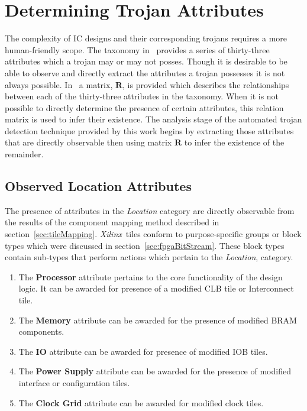 \documentclass[conference]{IEEEtran}
\newcommand{\Xilinx}{\textit{\gls{Xilinx}}~}
\begin{document}
\section{Determining Trojan Attributes} \label{sec:trojanAttributes}
The complexity of \acrlong{IC} designs and their corresponding trojans requires a more human-friendly scope.
The taxonomy in~\cite{samerAttribute} provides a series of thirty-three attributes which a trojan may or may not posses.
Though it is desirable to be able to observe and directly extract the attributes a trojan possesses it is not always possible. 
In~\cite{samerAttribute} a matrix, $\mathbf{R}$, is provided which describes the relationships between each of the thirty-three attributes in the taxonomy.
When it is not possible to directly determine the presence of certain attributes, this relation matrix is used to infer their existence.
The analysis stage of the automated trojan detection technique provided by this work begins by extracting those attributes that are directly observable then using matrix $\mathbf{R}$ to infer the existence of the remainder. 

\subsection{Observed Location Attributes}
The presence of attributes in the \textit{Location} category are directly observable from the results of the component mapping method described in section~\ref{sec:tileMapping}.
\Xilinx tiles conform to purpose-specific groups or block types which were discussed in section~\ref{sec:fpgaBitStream}.
These block types contain sub-types that perform actions which pertain to the \textit{Location}, category. 
\begin{enumerate}
	\item The \textbf{Processor} attribute pertains to the core functionality of the design logic. It can be awarded for presence of a modified \acrshort{CLB} tile or Interconnect tile.
	\item The \textbf{Memory} attribute can be awarded for the presence of modified \acrshort{BRAM} components.
	\item The \textbf{\acrshort{IO}} attribute can be awarded for presence of modified \acrshort{IOB} tiles.
	\item The \textbf{Power Supply} attribute can be awarded for the presence of modified interface or configuration tiles.
	\item The \textbf{Clock Grid} attribute can be awarded for modified clock tiles.
\end{enumerate}
\end{document}
